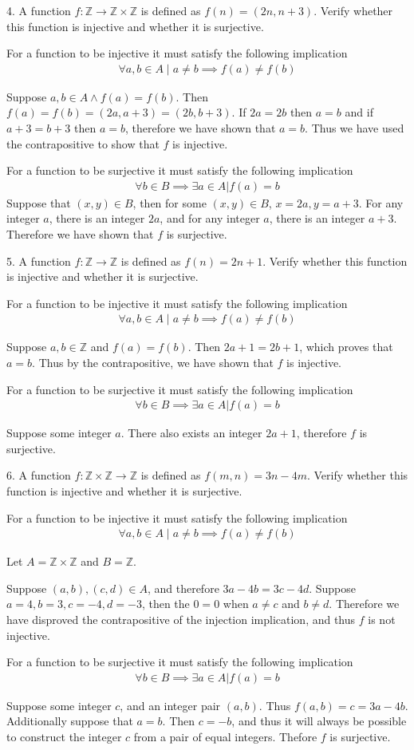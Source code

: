 \documentclass{idrisMemo}
\newcommand{\inj}{
\item For a function to be injective it must satisfy the following implication
\begin{align*}
    \forall a,b \in A\mid a\neq b\implies f(a)\neq f(b)
\end{align*}
}
\newcommand{\surj}{
\item For a function to be surjective it must satisfy the following implication
\begin{align*}
    \forall b \in B \implies \exists a \in A | f(a) = b
\end{align*}
}
\begin{document}
\begin{prooflist}{4. A function $f: \mathbb{Z} \rightarrow \mathbb{Z} \times
\mathbb{Z}$ is defined as $f(n)=(2 n, n+3)$. Verify whether this function is
injective and whether it is surjective.}
\inj{}
\item Suppose $a, b\in A \land f(a)=f(b)$. Then $f(a)=f(b)=(2a, a+3)=(2b, b+3)$.
    If $2a=2b$ then $a=b$ and if $a+3=b+3$ then $a=b$, therefore we have shown
    that $a=b$. Thus we have used the contrapositive to show that $f$ is
    injective.
\surj{}
Suppose that $(x, y) \in B$, then for some $(x,y)\in B$, $x=2a, y=a+3$. For any
integer $a$, there is an integer $2a$, and for any
integer $a$, there is an integer $a+3$. Therefore we have shown that $f$ is
surjective.
\end{prooflist}

\begin{prooflist}{5. A function $f: \mathbb{Z} \rightarrow \mathbb{Z}$ is
    defined as $f(n)=2 n+1$. Verify whether this function is injective and
whether it is surjective.}
\inj{}
\item Suppose $a, b \in \mathbb{Z}$ and $f(a) = f(b)$. Then $2a+1=2b+1$, which
    proves that $a=b$. Thus by the contrapositive, we have shown that $f$ is
    injective.
\surj{}
\item Suppose some integer $a$.  There also exists an integer $2a+ 1$, therefore
    $f$ is surjective.
\end{prooflist}

\begin{prooflist}{6. A function $f: \mathbb{Z} \times \mathbb{Z} \rightarrow
    \mathbb{Z}$ is defined as $f(m, n)=3 n-4 m$. Verify whether this function is
injective and whether it is surjective.}
\inj{}
\item Let $A=\mathbb{Z}\times\mathbb{Z}$ and $B=\mathbb{Z}$.
\item Suppose $(a, b), (c, d) \in A$, and therefore
    $3a-4b=3c-4d$. Suppose $a=4, b=3, c=-4, d=-3$, then the $0=0$ when $a\neq c$
    and $b\neq d$. Therefore we have disproved the contrapositive of the
    injection implication, and thus $f$ is not injective.
\surj{}
\item Suppose some integer $c$, and an integer pair $(a, b)$. Thus $f(a,
    b)=c=3a-4b$. Additionally suppose that $a=b$. Then $c = -b$, and thus it will
    always be possible to construct the integer $c$ from a pair of equal
    integers. Thefore $f$ is surjective.
\end{prooflist}
\end{document}
